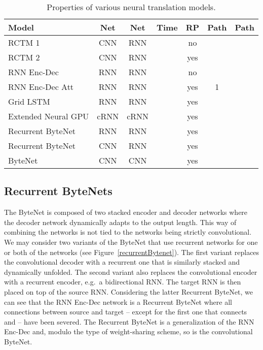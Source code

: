 \documentclass{article}
\begin{document}
\begin{table*}
\small
    \centering
    \bgroup
    \def\arraystretch{1.5}\begin{tabular}{l c  c c c c c}
    
        \toprule
        
       \textbf{Model}  & \textbf{Net} & \textbf{Net} & \textbf{Time} & \textbf{RP} & \textbf{Path} & \textbf{Path} \\
        \hline
        \multicolumn{1}{l}{RCTM 1 } & CNN & RNN &  & no &   &   \\ 
        \multicolumn{1}{l}{RCTM 2 } & CNN & RNN &  & yes &   &  \\
        \multicolumn{1}{l}{RNN Enc-Dec } & RNN & RNN &  & no &  &   \\
        \multicolumn{1}{l}{RNN Enc-Dec Att  } & RNN & RNN &  &
         yes & 1 &   \\
        \multicolumn{1}{l}{Grid LSTM } & RNN & RNN &  &
        yes &  &  \\ \multicolumn{1}{l}{Extended Neural GPU } & cRNN & cRNN &  &
        yes &  &   \\ \hline
        \multicolumn{1}{l}{Recurrent ByteNet} & RNN & RNN &  & yes
         &  &   \\
        \multicolumn{1}{l}{Recurrent ByteNet} & CNN & RNN &  &
        yes &  &   \\
        \multicolumn{1}{l}{ByteNet} & CNN & CNN &  &
        yes &  &  \\ \bottomrule
    \end{tabular}
    \egroup
    \caption{ Properties of various neural translation models.}
\label{properties}
\end{table*}

\subsection{Recurrent ByteNets}
The ByteNet is composed of two stacked encoder and decoder networks where the decoder network dynamically adapts to the output length. This way of combining the networks is not tied to the networks being strictly convolutional. We may consider two variants of the ByteNet that use recurrent networks for one or both of the networks (see Figure~\ref{recurrentBytenet}).
The first variant replaces the convolutional decoder with a recurrent one that is similarly stacked and dynamically unfolded. The second variant also replaces the convolutional encoder with a recurrent encoder, e.g.\ a bidirectional RNN. The target RNN is then placed on top of the source RNN. Considering the latter Recurrent ByteNet, we can see that the  RNN Enc-Dec network  \citep{DBLP:conf/nips/SutskeverVL14,DBLP:journals/corr/ChoMGBSB14}  is a Recurrent ByteNet where all connections between source and target -- except for the first one that connects  and  -- have been severed. The Recurrent ByteNet is a generalization of the RNN Enc-Dec and, modulo the type of weight-sharing scheme, so is the convolutional ByteNet. 
\end{document}
